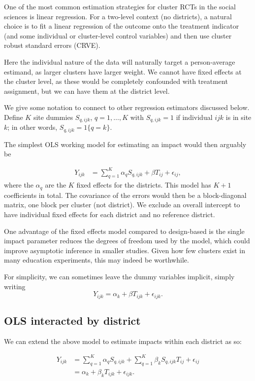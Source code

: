 \documentclass[]{article}
\begin{document}
One of the most common estimation strategies for cluster RCTs in the
social sciences is linear regression. For a two-level context (no
districts), a natural choice is to fit a linear regression of the
outcome onto the treatment indicator (and some individual or
cluster-level control variables) and then use cluster robust standard
errors (CRVE).

Here the individual nature of the data will naturally target a
person-average estimand, as larger clusters have larger weight. We
cannot have fixed effects at the cluster level, as these would be
completely confounded with treatment assignment, but we can have them at
the district level.

We give some notation to connect to other regression estimators
discussed below. Define $K$ site dummies $S_{q,ijk}$,
$q = 1, \ldots, K$ with $S_{q,ijk} = 1$ if individual $ijk$ is in
site $k$; in other words, $S_{q,ijk} = 1\{ q = k \}$.

The simplest OLS working model for estimating an impact would then
arguably be

\[
\begin{aligned}
Y_{ijk} &=  \sum_{q=1}^K \alpha_{q} S_{q,ijk} + \beta T_{ij} + \epsilon_{ij} ,
\end{aligned}
\] where the $\alpha_q$ are the $K$ fixed effects for the districts.
This model has $K+1$ coefficients in total. The covariance of the
errors would then be a block-diagonal matrix, one block per cluster (not
district). We exclude an overall intercept to have individual fixed
effects for each district and no reference district.

One advantage of the fixed effects model compared to design-based is the
single impact parameter reduces the degrees of freedom used by the
model, which could improve asymptotic inference in smaller studies.
Given how few clusters exist in many education experiments, this may
indeed be worthwhile.

For simplicity, we can sometimes leave the dummy variables implicit,
simply writing \[
 Y_{ijk} =  \alpha_k + \beta T_{ijk} + \epsilon_{ijk}.
\]

\subsection{OLS interacted by district}\label{ols-interacted-by-district}

We can extend the above model to estimate impacts within each district
as so:

\[
\begin{aligned}
Y_{ijk} &= \sum_{q=1}^K \alpha_{q} S_{q,ijk} + \sum_{q=1}^K \beta_k  S_{q,ijk} T_{ij} + \epsilon_{ij} \\
 &= \alpha_k + \beta_k T_{ijk} + \epsilon_{ijk} .
\end{aligned}
\]
\end{document}
